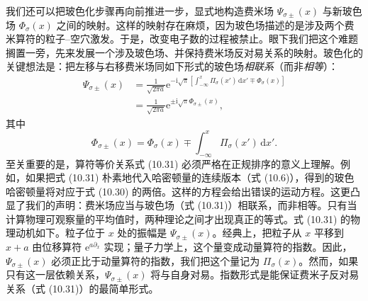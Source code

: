 我们还可以把玻色化步骤再向前推进一步，显式地构造费米场 $\Psi_{\sigma\pm}(x)$ 与新玻色场 $\Phi_{\sigma}(x)$ 之间的映射。这样的映射存在麻烦，因为玻色场描述的是涉及两个费米算符的粒子–空穴激发。于是，改变电子数的过程被禁止。眼下我们把这个难题搁置一旁，先来发展一个涉及玻色场、并保持费米场反对易关系的映射。玻色化的关键想法是：把左移与右移费米场同如下形式的玻色场\emph{相联系}（而非\emph{相等}）：
\begin{align*}
\Psi_{\sigma\pm}(x)&=\frac{1}{\sqrt{2\pi a}}\mathrm{e}^{-\mathrm{i}\sqrt{\pi}\left[\int_{-\infty}^{x}\Pi_{\sigma}(x')\,\mathrm{d}x'\mp\Phi_{\sigma}(x)\right]}\\
&=\frac{1}{\sqrt{2\pi a}}\mathrm{e}^{\pm\mathrm{i}\sqrt{\pi}\Phi_{\sigma\pm}(x)},
\tag{10.31}
\end{align*}
其中
\begin{equation*}
\Phi_{\sigma\pm}(x)=\Phi_{\sigma}(x)\mp\int_{-\infty}^{x}\Pi_{\sigma}(x')\,\mathrm{d}x'.
\tag{10.32}
\end{equation*}
至关重要的是，算符等价关系式 (10.31) 必须严格在正规排序的意义上理解。例如，如果把式 (10.31) 朴素地代入哈密顿量的连续版本（式 (10.6)），得到的玻色哈密顿量将对应于式 (10.30) 的两倍。这样的方程会给出错误的运动方程。这更凸显了我们的声明：费米场应当与玻色场（式 (10.31)）相联系，而非相等。只有当计算物理可观察量的平均值时，两种理论之间才出现真正的等式。式 (10.31) 的物理动机如下。粒子位于 $x$ 处的振幅是 $\Psi_{\sigma\pm}(x)$。经典上，把粒子从 $x$ 平移到 $x+a$ 由位移算符 $\mathrm{e}^{a\partial_{x}}$ 实现；量子力学上，这个量变成动量算符的指数。因此，$\Psi_{\sigma\pm}(x)$ 必须正比于动量算符的指数，我们把这个量记为 $\Pi_{\sigma}(x)$。然而，如果只有这一层依赖关系，$\Psi_{\sigma\pm}(x)$ 将与自身对易。指数形式是能保证费米子反对易关系（式 (10.31)）的最简单形式。

